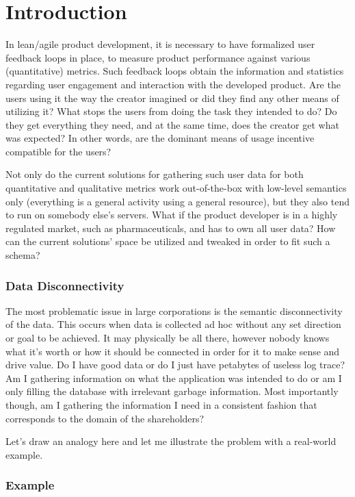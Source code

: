 \chapter{Introduction}

In lean/agile product development, it is necessary to have formalized user feedback loops in place, to measure product performance against various (quantitative) metrics. Such feedback loops obtain the information and statistics regarding user engagement and interaction with the developed product. Are the users using it the way the creator imagined or did they find any other means of utilizing it? What stops the users from doing the task they intended to do? Do they get everything they need, and at the same time, does the creator get what was expected? In other words, are the dominant means of usage incentive compatible for the users? 

Not only do the current solutions for gathering such user data for both quantitative and qualitative metrics work out-of-the-box with low-level semantics only (everything is a general activity using a general resource), but they also tend to run on somebody else's servers. What if the product developer is in a highly regulated market, such as pharmaceuticals, and has to own all user data? How can the current solutions' space be utilized and tweaked in order to fit such a schema?

\subsection*{Data Disconnectivity}

The most problematic issue in large corporations is the semantic disconnectivity of the data. This occurs when data is collected ad hoc without any set direction or goal to be achieved. It may physically be all there, however nobody knows what it's worth or how it should be connected in order for it to make sense and drive value. Do I have good data or do I just have petabytes of useless log trace? Am I gathering information on what the application was intended to do or am I only filling the database with irrelevant garbage information. Most importantly though, am I gathering the information I need in a consistent fashion that corresponds to the domain of the shareholders?

Let's draw an analogy here and let me illustrate the problem with a real-world example.

\newpage

\subsection*{Example}

